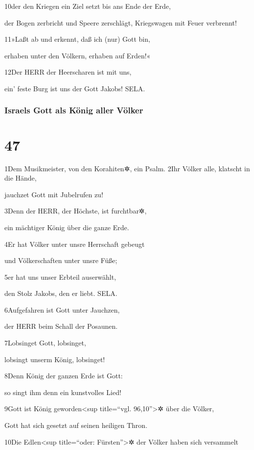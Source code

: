 10der den Kriegen ein Ziel setzt bis ans Ende der Erde,

der Bogen zerbricht und Speere zerschlägt, Kriegswagen mit Feuer
verbrennt!

11»Laßt ab und erkennt, daß ich (nur) Gott bin,

erhaben unter den Völkern, erhaben auf Erden!«

12Der HERR der Heerscharen ist mit uns,

ein' feste Burg ist uns der Gott Jakobs! SELA.

\hypertarget{israels-gott-als-kuxf6nig-aller-vuxf6lker}{%
\subsubsection{Israels Gott als König aller
Völker}\label{israels-gott-als-kuxf6nig-aller-vuxf6lker}}

\hypertarget{section-46}{%
\section{47}\label{section-46}}

1Dem Musikmeister, von den Korahiten✲, ein Psalm. 2Ihr Völker alle,
klatscht in die Hände,

jauchzet Gott mit Jubelrufen zu!

3Denn der HERR, der Höchste, ist furchtbar✲,

ein mächtiger König über die ganze Erde.

4Er hat Völker unter unsre Herrschaft gebeugt

und Völkerschaften unter unsre Füße;

5er hat uns unser Erbteil auserwählt,

den Stolz Jakobs, den er liebt. SELA.

6Aufgefahren ist Gott unter Jauchzen,

der HERR beim Schall der Posaunen.

7Lobsinget Gott, lobsinget,

lobsingt unserm König, lobsinget!

8Denn König der ganzen Erde ist Gott:

so singt ihm denn ein kunstvolles Lied!

9Gott ist König geworden\textless sup title=``vgl. 96,10''\textgreater✲
über die Völker,

Gott hat sich gesetzt auf seinen heiligen Thron.

10Die Edlen\textless sup title=``oder: Fürsten''\textgreater✲ der Völker
haben sich versammelt

